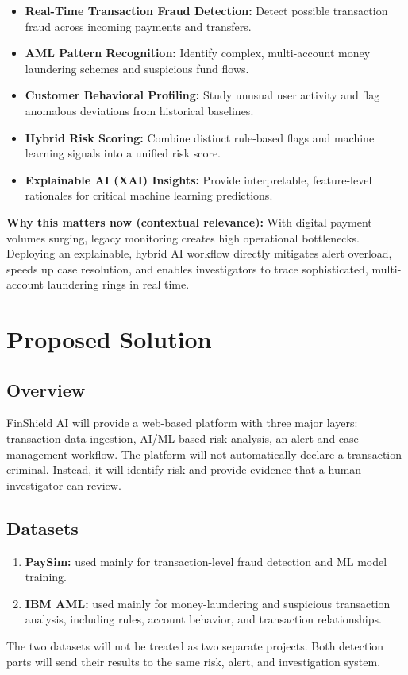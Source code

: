 \documentclass[11pt,a4paper]{article}
\begin{document}
\begin{itemize}[leftmargin=0.7cm]
    \item \textbf{Real-Time Transaction Fraud Detection:} Detect possible transaction fraud across incoming payments and transfers.
    \item \textbf{AML Pattern Recognition:} Identify complex, multi-account money laundering schemes and suspicious fund flows.
    \item \textbf{Customer Behavioral Profiling:} Study unusual user activity and flag anomalous deviations from historical baselines.
    \item \textbf{Hybrid Risk Scoring:} Combine distinct rule-based flags and machine learning signals into a unified risk score.
    \item \textbf{Explainable AI (XAI) Insights:} Provide interpretable, feature-level rationales for critical machine learning predictions. 
\end{itemize}

\textbf{Why this matters now (contextual relevance):} With digital payment volumes surging, legacy monitoring creates high operational bottlenecks. Deploying an explainable, hybrid AI workflow directly mitigates alert overload, speeds up case resolution, and enables investigators to trace sophisticated, multi-account laundering rings in real time.

\section{Proposed Solution %
}
\subsection{Overview}
FinShield AI will provide a web-based platform with three major layers: transaction data
ingestion, AI/ML-based risk analysis, an alert and case-management workflow. The platform will not automatically declare a transaction criminal. Instead, it will
identify risk and provide evidence that a human investigator can review.

\subsection{Datasets}
\begin{enumerate}[leftmargin=0.7cm]

    \item \textbf{PaySim:} used mainly for transaction-level fraud detection and ML model training.
    \item \textbf{IBM AML:}  used mainly for money-laundering and suspicious transaction analysis, including rules, account behavior, and transaction relationships.
\end{enumerate}
    The two datasets will not be treated as two separate projects. Both detection parts will send their results to the same risk, alert, and investigation system.
\end{document}
